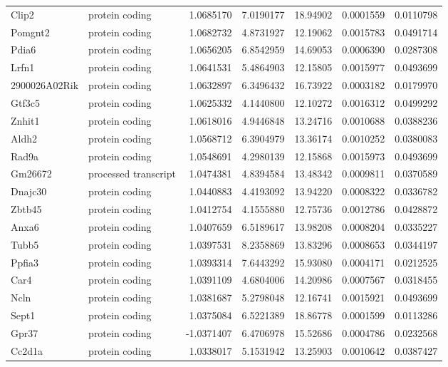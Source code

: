 \documentclass[onehalf,12pt]{beavtex}
\begin{document}
\begin{longtable}{llrrrrr}
  Clip2 & protein coding & 1.0685170 & 7.0190177 & 18.94902 & 0.0001559 & 0.0110798\\
  \addlinespace
  Pomgnt2 & protein coding & 1.0682732 & 4.8731927 & 12.19062 & 0.0015783 & 0.0491714\\
  Pdia6 & protein coding & 1.0656205 & 6.8542959 & 14.69053 & 0.0006390 & 0.0287308\\
  Lrfn1 & protein coding & 1.0641531 & 5.4864903 & 12.15805 & 0.0015977 & 0.0493699\\
  2900026A02Rik & protein coding & 1.0632897 & 6.3496432 & 16.73922 & 0.0003182 & 0.0179970\\
  Gtf3c5 & protein coding & 1.0625332 & 4.1440800 & 12.10272 & 0.0016312 & 0.0499292\\
  \addlinespace
  Znhit1 & protein coding & 1.0618016 & 4.9446848 & 13.24716 & 0.0010688 & 0.0388236\\
  Aldh2 & protein coding & 1.0568712 & 6.3904979 & 13.36174 & 0.0010252 & 0.0380083\\
  Rad9a & protein coding & 1.0548691 & 4.2980139 & 12.15868 & 0.0015973 & 0.0493699\\
  Gm26672 & processed transcript & 1.0474381 & 4.8394584 & 13.48342 & 0.0009811 & 0.0370589\\
  Dnajc30 & protein coding & 1.0440883 & 4.4193092 & 13.94220 & 0.0008322 & 0.0336782\\
  \addlinespace
  Zbtb45 & protein coding & 1.0412754 & 4.1555880 & 12.75736 & 0.0012786 & 0.0428872\\
  Anxa6 & protein coding & 1.0407659 & 6.5189617 & 13.98208 & 0.0008204 & 0.0335227\\
  Tubb5 & protein coding & 1.0397531 & 8.2358869 & 13.83296 & 0.0008653 & 0.0344197\\
  Ppfia3 & protein coding & 1.0393314 & 7.6443292 & 15.93080 & 0.0004171 & 0.0212525\\
  Car4 & protein coding & 1.0391109 & 4.6804006 & 14.20986 & 0.0007567 & 0.0318455\\
  \addlinespace
  Ncln & protein coding & 1.0381687 & 5.2798048 & 12.16741 & 0.0015921 & 0.0493699\\
  Sept1 & protein coding & 1.0375084 & 6.5221389 & 18.86778 & 0.0001599 & 0.0113286\\
  Gpr37 & protein coding & -1.0371407 & 6.4706978 & 15.52686 & 0.0004786 & 0.0232568\\
  Cc2d1a & protein coding & 1.0338017 & 5.1531942 & 13.25903 & 0.0010642 & 0.0387427\\

\end{longtable}
\end{document}
